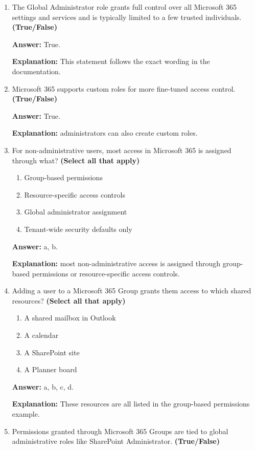 \documentclass[10pt]{article}
\begin{document}
\begin{enumerate}[leftmargin=*]
\item The Global Administrator role grants full control over all Microsoft 365 settings and services and is typically limited to a few trusted individuals. \textbf{(True/False)}

\textbf{Answer:} True.

\textbf{Explanation:} This statement follows the exact wording in the documentation.

\item Microsoft 365 supports custom roles for more fine-tuned access control. \textbf{(True/False)}

\textbf{Answer:} True.

\textbf{Explanation:} administrators can also create custom roles.

\item For non-administrative users, most access in Microsoft 365 is assigned through what? \textbf{(Select all that apply)}
\begin{enumerate}[label=\alph*., leftmargin=1.5em]
\item Group-based permissions
\item Resource-specific access controls
\item Global administrator assignment
\item Tenant-wide security defaults only
\end{enumerate}
\textbf{Answer:} a, b.

\textbf{Explanation:} most non-administrative access is assigned through group-based permissions or resource-specific access controls.

\item Adding a user to a Microsoft 365 Group grants them access to which shared resources? \textbf{(Select all that apply)}
\begin{enumerate}[label=\alph*., leftmargin=1.5em]
\item A shared mailbox in Outlook
\item A calendar
\item A SharePoint site
\item A Planner board
\end{enumerate}
\textbf{Answer:} a, b, c, d.

\textbf{Explanation:} These resources are all listed in the group-based permissions example.

\item Permissions granted through Microsoft 365 Groups are tied to global administrative roles like SharePoint Administrator. \textbf{(True/False)}


\end{enumerate}
\end{document}
